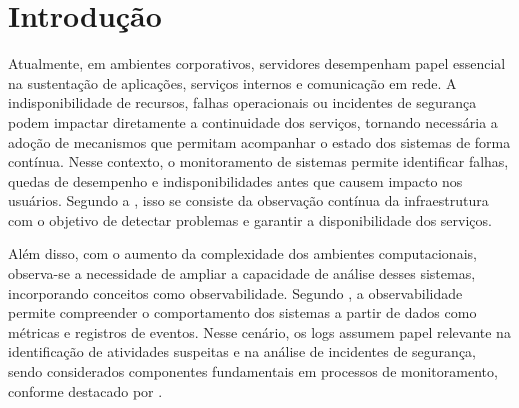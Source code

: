 \documentclass[
    12pt
    ,oneside
    ,a4paper
    ,chapter=TITLE
    ,section=TITLE
    ,sumario=abnt-6027-2012]{abntex2}
\begin{document}

\sumario

\textual

\chapter{Introdução}
\label{cap:introducao}

Atualmente, em ambientes corporativos, servidores desempenham papel essencial na sustentação de aplicações, serviços internos e comunicação em rede. A indisponibilidade de recursos, falhas operacionais ou incidentes de segurança podem impactar diretamente a continuidade dos serviços, tornando necessária a adoção de mecanismos que permitam acompanhar o estado dos sistemas de forma contínua. Nesse contexto, o monitoramento de sistemas permite identificar falhas, quedas de desempenho e indisponibilidades antes que causem impacto nos usuários. Segundo a , isso se consiste da observação contínua da infraestrutura com o objetivo de detectar problemas e garantir a disponibilidade dos serviços.

Além disso, com o aumento da complexidade dos ambientes computacionais, observa-se a necessidade de ampliar a capacidade de análise desses sistemas, incorporando conceitos como observabilidade. Segundo , a observabilidade permite compreender o comportamento dos sistemas a partir de dados como métricas e registros de eventos. Nesse cenário, os logs assumem papel relevante na identificação de atividades suspeitas e na análise de incidentes de segurança, sendo considerados componentes fundamentais em processos de monitoramento, conforme destacado por .
\end{document}
